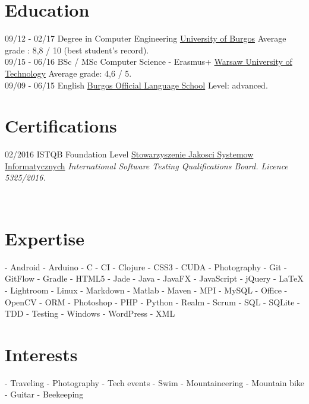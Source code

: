 \documentclass[]{friggeri-cv}
\begin{document}
\section{Education}
\begin{entrylist}
  \entry
    {09/12 - 02/17}
    {Degree in Computer Engineering}
    {\href{http://wwww.ubu.es/}{University of Burgos}}
    {Average grade : 8,8 / 10 (best student’s record).\\}
  \entry
    {09/15 - 06/16}
    {BSc / MSc Computer Science - Erasmus+}
    {\href{https://www.pw.edu.pl/}{Warsaw University of Technology}}
    {Average grade: 4,6 / 5.\\}
  \entry
    {09/09 - 06/15}
    {English}
    {\href{http://eoiburgos.centros.educa.jcyl.es/}{Burgos Official Language School}}
    {Level: advanced.\\}
\end{entrylist}

\section{Certifications}
\begin{entrylist}
  \entry
    {02/2016}
    {ISTQB Foundation Level}
    {\href{http://sjsi.org/}{Stowarzyszenie Jakosci Systemow Informatycznych}}
    {\emph{International Software Testing Qualifications Board. Licence 5325/2016.}}
\end{entrylist}

\newpage

\begin{aside}
~
~
~
  \section{\vspace{0.49cm}Expertise}
    - Android
    - Arduino
    - C
    - CI    
    - Clojure
    - CSS3
    - CUDA
    - Photography
    - Git
    - GitFlow    
    - Gradle
    - HTML5
    - Jade
    - Java
    - JavaFX
    - JavaScript
    - jQuery
    - \LaTeX
    - Lightroom
    - Linux
    - Markdown
    - Matlab
    - Maven
    - MPI
    - MySQL
    - Office
    - OpenCV
    - ORM
    - Photoshop
    - PHP
    - Python
    - Realm
    - Scrum
    - SQL
    - SQLite
    - TDD
    - Testing
    - Windows
    - WordPress
    - XML
    ~
  \section{Interests}
    - Traveling
    - Photography
    - Tech events    
    - Swim
    - Mountaineering
    - Mountain bike
    - Guitar    
    - Beekeeping
    ~
\end{aside}
\end{document}
